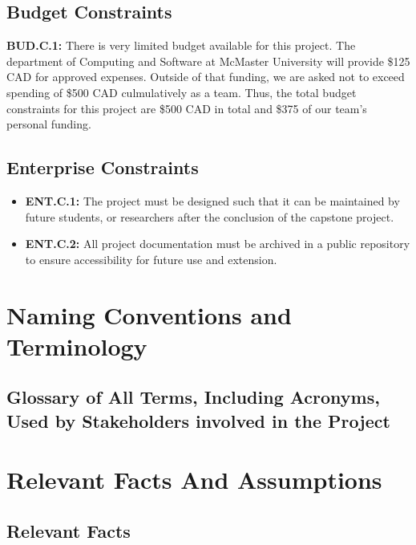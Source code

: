 \documentclass[12pt]{article}
\begin{document}
\subsection{Budget Constraints}

\par{\textbf{BUD.C.1:} There is very limited budget available for this project. The department of Computing and Software at McMaster University 
will provide \$125 CAD for approved expenses. Outside of that funding, we are asked not to exceed spending of \$500 CAD
culmulatively as a team. Thus, the total budget constraints for this project are \$500 CAD in total and \$375 of our team's personal funding.}

\subsection{Enterprise Constraints}

\begin{itemize}
    \item \textbf{ENT.C.1:} The project must be designed such that it can be maintained by future students, or researchers after the conclusion of the capstone project. 
    \item \textbf{ENT.C.2:} All project documentation must be archived in a public repository to ensure accessibility for future use and extension. 
\end{itemize}

\section{Naming Conventions and Terminology}
\subsection{Glossary of All Terms, Including Acronyms, Used by Stakeholders
involved in the Project}

\printnoidxglossary[type=SWE, title={Software Engineering Terms}]
\printnoidxglossary[type=domain, title={Domain-Specific Research Terms}]
\printnoidxglossary[type=general, title={General Terms}]



\section{Relevant Facts And Assumptions}
\subsection{Relevant Facts}
\end{document}
